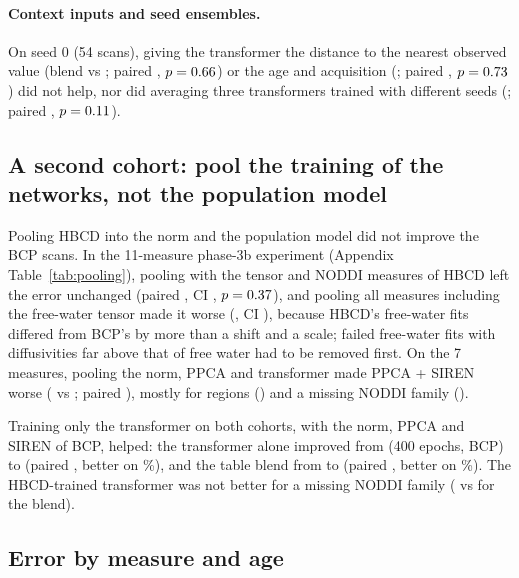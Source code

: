 \documentclass[11pt]{article}
\begin{document}
\paragraph{Context inputs and seed ensembles.} On seed 0 (54 scans), giving the transformer the distance to the nearest
observed value (blend \xDistBlend{} vs \rSeedZeroBlend; paired \xDistRatioBlend, $p=0.66$) or the age and
acquisition (\xCtxBlend{}; paired \xCtxRatioBlend, $p=0.73$) did not help, nor did averaging three transformers
trained with different seeds (\xMembersBlend{}; paired \xMembersRatioBlend, $p=0.11$).

\subsection{A second cohort: pool the training of the networks, not the population model}\label{sec:pooling}

Pooling HBCD into the norm and the population model did not improve the BCP scans. In the 11-measure phase-3b
experiment (Appendix Table~\ref{tab:pooling}), pooling with the tensor and NODDI measures of HBCD left the error
unchanged (paired \vpTNRatio{}, CI \vpTNCi{}, $p=0.37$), and pooling all measures including the free-water tensor
made it worse (\vpAllRatio{}, CI \vpAllCi{}), because HBCD's free-water fits differed from BCP's by more than a shift
and a scale; failed free-water fits with diffusivities far above that of free water had to be removed first. On the 7
measures, pooling the norm, PPCA and transformer made PPCA + SIREN worse (\rPooledDefault{} vs \rDefault{}; paired
\cQRatio{}), mostly for regions (\rPooledDefaultRegion) and a missing NODDI family (\rPooledDefaultWnoddi).

Training only the transformer on both cohorts, with the norm, PPCA and SIREN of BCP, helped: the transformer alone
improved from \rTfFour{} (400 epochs, BCP) to \rRefTf{} (paired \cRRatio{}, better on \cRBetter\%), and the
table blend from \rFinal{} to \rRefFinal{} (paired \cSRatio{}, better on \cSBetter\%). The HBCD-trained transformer was
not better for a missing NODDI family (\rRefFinalWnoddi{} vs \rFinalWnoddi{} for the blend).

\subsection{Error by measure and age}

\begin{table}[t]
\centering\footnotesize
\caption{Error relative to the age-bin mean per measure (four patterns, mean over age bins and seeds), and for a
whole missing family. $^{\ddagger}$First row: absolute RMSE of the age-bin mean (FA, NDI, ODI, FWF $\times10^{3}$;
MD, RD, AD $\times10^{6}$\,mm$^2$/s).}\label{tab:metric}
\setlength{\tabcolsep}{5pt}

\end{table}
\end{document}
